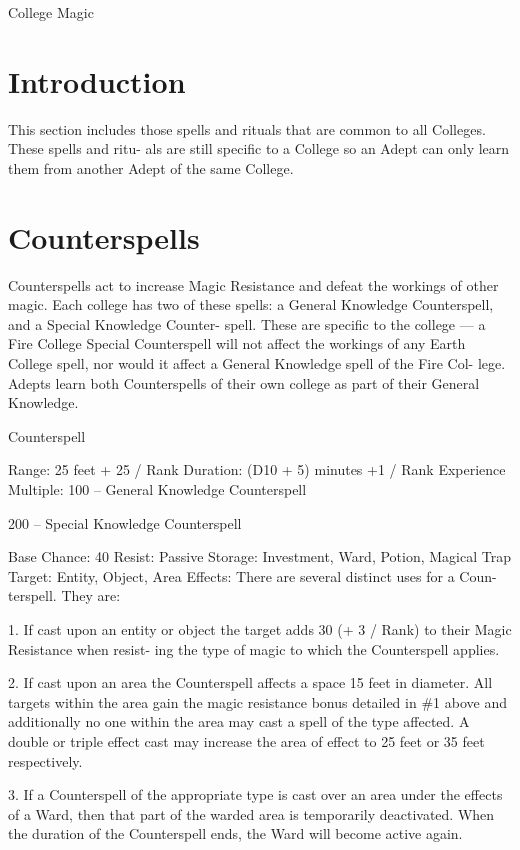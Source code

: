 \begin{Chapter}{College Magic}

\section{Introduction}

This  section  includes  those  spells  and  rituals  that 
are common to all Colleges. These spells and ritu-
als  are  still  specific  to  a  College  so  an  Adept  can 
only  learn  them  from  another  Adept  of  the  same 
College. 

\section{Counterspells}

Counterspells act to increase Magic Resistance and 
defeat  the  workings  of  other  magic.  Each  college 
has  two  of  these  spells:  a  General  Knowledge 
Counterspell,  and  a  Special  Knowledge  Counter-
spell.  These  are  specific  to  the  college  —  a  Fire 
College  Special  Counterspell  will  not  affect  the 
workings  of  any  Earth  College  spell,  nor  would  it 
affect  a  General  Knowledge  spell  of  the  Fire  Col-
lege. Adepts learn both Counterspells of their own 
college as part of their General Knowledge. 

Counterspell 

Range: 25 feet + 25 / Rank 
Duration: (D10 + 5) minutes +1 / Rank 
Experience Multiple: 
100 – General Knowledge Counterspell 

200 – Special Knowledge Counterspell 

Base Chance: 40%
Resist: Passive 
Storage: Investment, Ward, Potion, Magical Trap 
Target: Entity, Object, Area 
Effects: There are several distinct uses for a Coun-
terspell. They are: 

1. If cast upon an entity or object the target adds 30 
(+ 3 / Rank) to their Magic Resistance when resist-
ing  the  type  of  magic  to  which  the  Counterspell 
applies. 

2.  If  cast  upon  an  area  the  Counterspell  affects  a 
space  15  feet  in  diameter.  All  targets  within  the 
area gain the magic resistance bonus detailed in \#1 
above and additionally no one within the area may 
cast a spell of the type affected. A double or triple 
effect cast may increase the area of effect to 25 feet 
or 35 feet respectively. 

3.  If  a  Counterspell  of  the  appropriate  type  is  cast 
over an area under the effects of a Ward, then that 
part of the warded area is temporarily deactivated. 
When  the  duration  of  the  Counterspell  ends,  the 
Ward will become active again. 


\end{Chapter}
